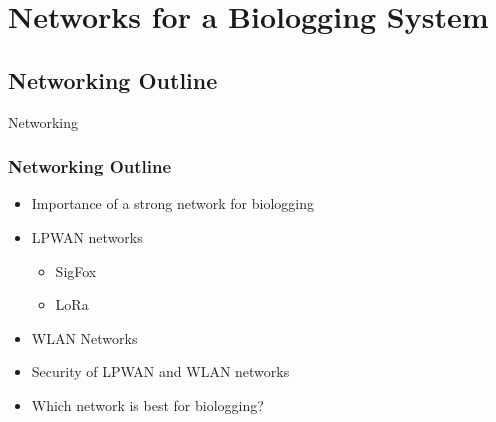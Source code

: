 \documentclass{beamer}
\begin{document}
\section{Networks for a Biologging System}

\subsection{Networking Outline}
  \begin{frame}{Networking}
    \frametitle{Networking Outline}
    \begin{itemize}
      \item Importance of a strong network for biologging
      \item LPWAN networks
      \begin{itemize}
        \item SigFox
        \item LoRa
      \end{itemize}
      \item WLAN Networks
      \item Security of LPWAN and WLAN networks
      \item Which network is best for biologging?
    \end{itemize}
  \end{frame}
\end{document}
